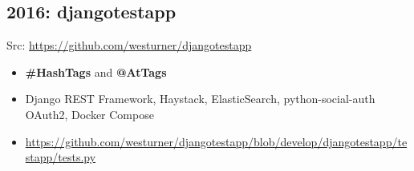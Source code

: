 \documentclass[letter,,openany,oneside]{sphinxhowto}
\begin{document}
\subsection{2016: djangotestapp}
\label{resume:djangotestapp}
\begin{DUlineblock}{0em}
\item[] Src: \url{https://github.com/westurner/djangotestapp}
\end{DUlineblock}
\begin{itemize}
\item {} 
\textbf{\#HashTags} and \textbf{@AtTags}

\item {} 
Django REST Framework, Haystack, ElasticSearch, python-social-auth
OAuth2, Docker Compose

\item {} 
\url{https://github.com/westurner/djangotestapp/blob/develop/djangotestapp/testapp/tests.py}

\end{itemize}
\end{document}
